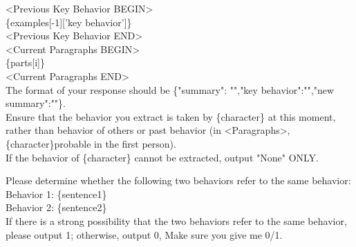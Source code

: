 \begin{tcolorbox}[title = {Next Behavior Generation Prompt}, breakable]
<Previous Key Behavior BEGIN>\\
\{examples[-1]['key behavior']\}\\
<Previous Key Behavior END>\\

<Current Paragraphs BEGIN>\\
\{parts[i]\}\\
<Current Paragraphs END>\\

The format of your response should be \{"summary": "","key behavior":"","new summary":""\}.\\
Ensure that the behavior you extract is taken by \{character\} at this moment, rather than behavior of others or past behavior (in <Paragraphs>, \{character\}probable in the first person).\\
If the behavior of \{character\} cannot be extracted, output "None" ONLY.

\end{tcolorbox}





\begin{tcolorbox}[title = {Similirity Check}, breakable]

Please determine whether the following two behaviors refer to the same behavior:\\
Behavior 1: \{sentence1\}\\
Behavior 2: \{sentence2\}\\
If there is a strong possibility that the two behaviors refer to the same behavior, please output 1; otherwise, output 0, Make sure you give me 0/1.
\end{tcolorbox}




